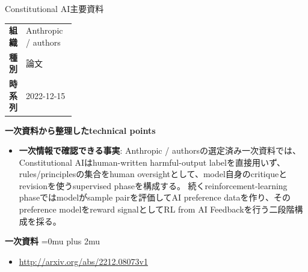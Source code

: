 \begin{technicalnote}{Constitutional AI}{主要資料}
\begingroup
\begin{tabularx}{\linewidth}{@{}>{\bfseries}p{0.22\linewidth}X@{}}
組織 & Anthropic / authors \\
種別 & 論文 \\
時系列 & 2022-12-15 \\
\end{tabularx}
\smallskip
{\bfseries 一次資料から整理したtechnical points}
\begin{itemize}[leftmargin=1.5em,itemsep=0.35em]
\item \textbf{一次情報で確認できる事実}: Anthropic / authorsの選定済み一次資料では、Constitutional AIはhuman-written harmful-output labelを直接用いず、rules/principlesの集合をhuman oversightとして、model自身のcritiqueとrevisionを使うsupervised phaseを構成する。 続くreinforcement-learning phaseではmodelがsample pairを評価してAI preference dataを作り、そのpreference modelをreward signalとしてRL from AI Feedbackを行う二段階構成を採る。
\end{itemize}
\begin{minipage}{\linewidth}
\begin{samepage}
{\bfseries 一次資料}
\begingroup\sloppy
\Urlmuskip=0mu plus 2mu\relax
\begin{itemize}[leftmargin=1.5em,itemsep=0.25em]
\item {\scriptsize\url{http://arxiv.org/abs/2212.08073v1}}
\end{itemize}
\endgroup
\end{samepage}
\end{minipage}
\endgroup
\end{technicalnote}
\medskip

